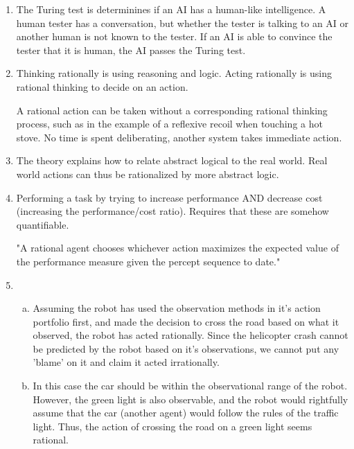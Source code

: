 
%

\begin{enumerate}

    \item
        The Turing test is determinines if an AI has a human-like intelligence. A human tester has a conversation, but whether the tester is talking to an AI or another human is not known to the tester. If an AI is able to convince the tester that it is human, the AI passes the Turing test.

    \item
        Thinking rationally is using reasoning and logic. Acting rationally is using rational thinking to decide on an action.

        A rational action can be taken without a corresponding rational thinking process, such as in the example of a reflexive recoil when touching a hot stove. No time is spent deliberating, another system takes immediate action.

    \item
        The theory explains how to relate abstract logical to the real world. Real world actions can thus be rationalized by more abstract logic.

    \item
        Performing a task by trying to increase performance AND decrease cost (increasing the performance/cost ratio). Requires that these are somehow quantifiable.

        "A rational agent chooses whichever action maximizes the expected value of the performance measure given the percept sequence to date."

    \item
        \begin{enumerate}[(a)]
            \item
                Assuming the robot has used the observation methods in it's action portfolio first, and made the decision to cross the road based on what it observed, the robot has acted rationally.
                Since the helicopter crash cannot be predicted by the robot based on it's observations, we cannot put any 'blame' on it and claim it acted irrationally.

            \item
                In this case the car should be within the observational range of the robot. However, the green light is also observable, and the robot would rightfully assume that the car (another agent) would follow the rules of the traffic light.
                Thus, the action of crossing the road on a green light seems rational.


\end{enumerate}
\end{enumerate}
